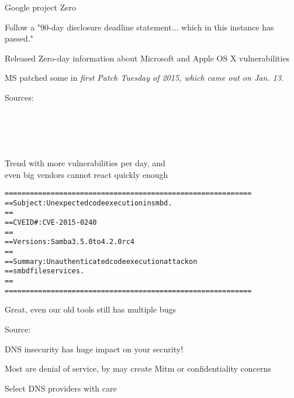 \documentclass[20pt,landscape,a4paper,footrule]{foils}
\begin{document}
\begin{list1}
\item Google project Zero
\item Follow a
"90-day disclosure deadline statement... which in this instance has passed."
\item Released Zero-day information about Microsoft and Apple OS X vulnerabilities
\item MS patched some in \emph{first Patch Tuesday of 2015, which came out on Jan. 13.}
\end{list1}

Sources:\\
{\tiny
{}\\
\\
\\
\\
}

Trend with more vulnerabilities per day, and\\
even big vendors cannot react quickly enough




\begin{alltt}\small
  ===========================================================
  == Subject:     Unexpected code execution in smbd.
  ==
  == CVE ID#:     CVE-2015-0240
  ==
  == Versions:    Samba 3.5.0 to 4.2.0rc4
  ==
  == Summary:     Unauthenticated code execution attack on
  ==		smbd file services.
  ==
  ===========================================================
\end{alltt}

\centerline{Great, even our old tools still has multiple bugs}

Source:\\



\begin{list1}
\item DNS insecurity has huge impact on your security!
\item Most are denial of service, by may create Mitm or confidentiality concerns
\item Select DNS providers with care
\end{list1}
\end{document}
